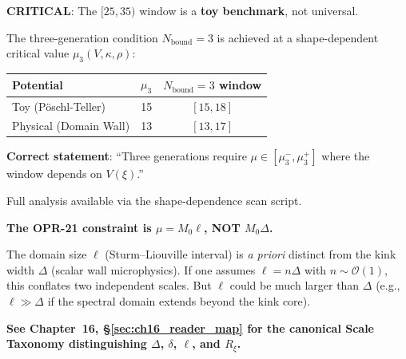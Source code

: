 \begin{tcolorbox}[colback=yellow!10!white, colframe=yellow!70!black,
    title=\textbf{OPR-21R Update: $\mu$-Window is Shape-Dependent}]
\label{box:opr21_mu_shape_dependent}

\textbf{CRITICAL}: The $[25, 35)$ window is a \textbf{toy benchmark}, not universal.

The three-generation condition $N_{\text{bound}} = 3$ is achieved at a shape-dependent
critical value $\mu_3(V, \kappa, \rho)$:

\begin{center}
\begin{tabular}{lcc}
\toprule
\textbf{Potential} & $\mu_3$ & $N_{\text{bound}}=3$ window \\
\midrule
Toy (P\"oschl-Teller) & 15 & $[15, 18]$ \\
Physical (Domain Wall) & 13 & $[13, 17]$ \\
\bottomrule
\end{tabular}
\end{center}

\textbf{Correct statement}: ``Three generations require $\mu \in [\mu_3^-, \mu_3^+]$
where the window depends on $V(\xi)$.''

Full analysis available via the shape-dependence scan script.

\end{tcolorbox}

\begin{tcolorbox}[colback=red!3!white, colframe=red!50!black,
    title=\textbf{Critical Clarification: What $\mu$ Constrains}]
\textbf{The OPR-21 constraint is $\mu = M_0 \ell$, NOT $M_0 \Delta$.}

\medskip
The domain size $\ell$ (Sturm--Liouville interval) is \emph{a priori} distinct
from the kink width $\Delta$ (scalar wall microphysics). If one assumes
$\ell = n\Delta$ with $n \sim \mathcal{O}(1)$, this conflates two independent
scales. But $\ell$ could be much larger than $\Delta$ (e.g., $\ell \gg \Delta$
if the spectral domain extends beyond the kink core).

\medskip
\textbf{See Chapter~16, \S\ref{sec:ch16_reader_map} for the canonical Scale
Taxonomy distinguishing $\Delta$, $\delta$, $\ell$, and $R_\xi$.}
\end{tcolorbox}

